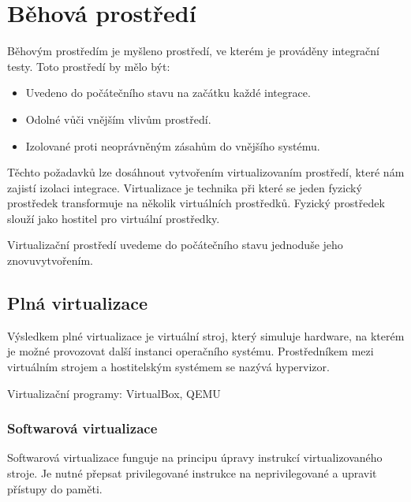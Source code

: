 \chapter{Běhová prostředí}

Běhovým prostředím je myšleno prostředí, ve kterém je prováděny integrační testy.
Toto prostředí by mělo být:

\begin{itemize}
	\item Uvedeno do počátečního stavu na začátku každé integrace.
	\item Odolné vůči vnějším vlivům prostředí.
	\item Izolované proti neoprávněným zásahům do vnějšího systému.
\end{itemize}

Těchto požadavků lze dosáhnout vytvořením virtualizovaním prostředí, které nám zajistí izolaci integrace.
Virtualizace je technika při které se jeden fyzický prostředek transformuje na několik virtuálních prostředků.
Fyzický prostředek slouží jako hostitel pro virtuální prostředky.

Virtualizační prostředí uvedeme do počátečního stavu jednoduše jeho znovuvytvořením.


\section{Plná virtualizace}


Výsledkem plné virtualizace je virtuální stroj, který simuluje hardware, na kterém je možné provozovat další instanci operačního systému.
Prostředníkem mezi virtuálním strojem a hostitelským systémem se nazývá hypervizor.


Virtualizační programy: VirtualBox, QEMU

\subsection{Softwarová virtualizace}

Softwarová virtualizace funguje na principu úpravy instrukcí virtualizovaného stroje.
Je nutné přepsat privilegované instrukce na neprivilegované a upravit přístupy do paměti.

